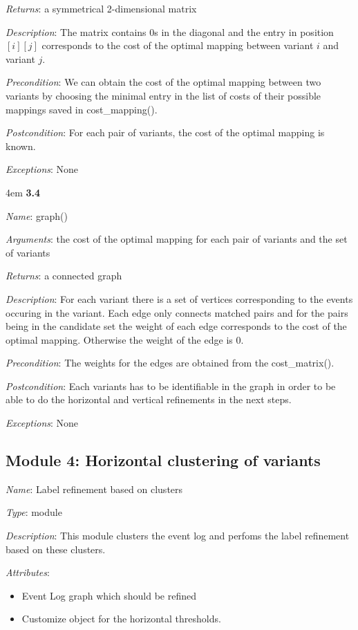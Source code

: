 \documentclass[notitlepage]{article}
\begin{document}
\begin{flushleft}
\textit{Returns}: a symmetrical 2-dimensional matrix

\textit{Description}: The matrix contains 0s in the diagonal and the entry in position $[i][j]$ corresponds to the cost of the optimal mapping between variant $i$ and variant $j$. 

\textit{Precondition}: We can obtain the cost of the optimal mapping between two variants by choosing the minimal entry in the list of costs of their possible mappings saved in cost\_mapping().

\textit{Postcondition}: For each pair of variants, the cost of the optimal mapping is known.

\textit{Exceptions}: None
\par
\endgroup


\medskip

\par
\begingroup
\leftskip4em
\textbf{3.4} 

\textit{Name}: graph()

\textit{Arguments}: the cost of the optimal mapping for each pair of variants and the set of variants

\textit{Returns}: a connected graph

\textit{Description}: For each variant there is a set of vertices corresponding to the events occuring in the variant. Each edge only connects matched pairs and for the pairs being in the candidate set the weight of each edge corresponds to the cost of the optimal mapping. Otherwise the weight of the edge is 0.

\textit{Precondition}: The weights for the edges are obtained from the cost\_matrix().

\textit{Postcondition}: Each variants has to be identifiable in the graph in order to be able to do the horizontal and vertical refinements in the next steps.

\textit{Exceptions}: None
\par
\endgroup


\subsection{Module 4: Horizontal clustering of variants}
\textit{Name}: Label refinement based on clusters

\textit{Type}: module

\textit{Description}: This module clusters the event log and perfoms the label refinement based on these clusters.

\textit{Attributes}: \begin{itemize}
	\item Event Log graph which should be refined 
	\item Customize object for the horizontal thresholds.
\end{itemize}


\end{flushleft}
\end{document}
